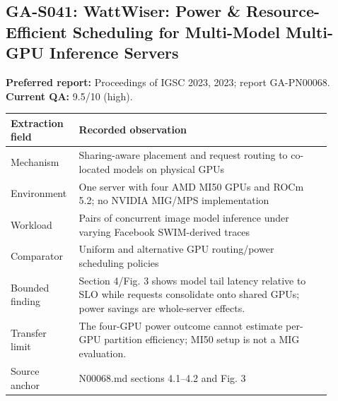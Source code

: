 \subsection{GA-S041: WattWiser: Power \& Resource-Efficient Scheduling for Multi-Model Multi-GPU Inference Servers}
\textbf{Preferred report:} Proceedings of IGSC 2023, 2023; report GA-PN00068. \textbf{Current QA:} 9.5/10 (high).
\begin{longtable}{P{0.15\linewidth}P{0.75\linewidth}}
\toprule Extraction field & Recorded observation\\\midrule\endhead
Mechanism & Sharing-aware placement and request routing to co-located models on physical GPUs\\
Environment & One server with four AMD MI50 GPUs and ROCm 5.2; no NVIDIA MIG/MPS implementation\\
Workload & Pairs of concurrent image model inference under varying Facebook SWIM-derived traces\\
Comparator & Uniform and alternative GPU routing/power scheduling policies\\
Bounded finding & Section 4/Fig. 3 shows model tail latency relative to SLO while requests consolidate onto shared GPUs; power savings are whole-server effects.\\
Transfer limit & The four-GPU power outcome cannot estimate per-GPU partition efficiency; MI50 setup is not a MIG evaluation.\\
Source anchor & N00068.md sections 4.1–4.2 and Fig. 3\\
\bottomrule\end{longtable}
